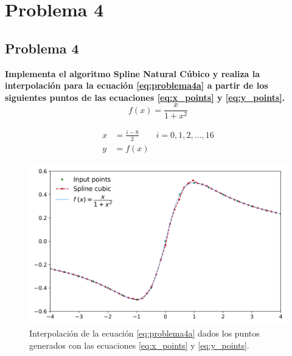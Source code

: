 \section{Problema 4}

\subsection*{Problema 4}

\textbf{Implementa el algoritmo Spline Natural Cúbico y realiza la interpolación para la ecuación \ref{eq:problema4a} a partir de los siguientes puntos de las ecuaciones \ref{eq:x_points} y \ref{eq:y_points}.}
\begin{equation}
	f(x) = \frac{x}{1+x^2} \label{eq:problema4a}
\end{equation}

\begin{align}
	x & = \frac{i-8}{2} \qquad i=0,1,2,\dots,16 \label{eq:x_points} \\
	y & = f(x) \label{eq:y_points}
\end{align}
\begin{figure}[H]
	\centering
	\includegraphics[width=14cm]{Graphics/problema04a.png}
	\caption{Interpolación de la ecuación \ref{eq:problema4a} dados los puntos generados con las ecuaciones \ref{eq:x_points} y \ref{eq:y_points}.}
\end{figure}
